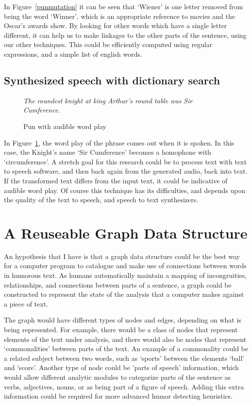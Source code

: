 In Figure~\ref{punmutation} it can be seen that `Wiener'  is one letter removed from being the word `Winner', which is an appropriate reference to movies and the Oscar's awards show. By looking for other words which have a single letter different, it can help us to make linkages to the other parts of the sentence, using our other techniques. This could be efficiently computed using regular expressions, and a simple list of english words.

\subsection{Synthesized speech with dictionary search}
\begin{figure}[h]
\begin{mdframed}
  \emph{The roundest knight at king Arthur's round table was Sir Cumference.}
  \caption{Pun with audible word play}
 \label{sircumference}
\end{mdframed}
\end{figure}

In Figure~\ref{sircumference}, the word play of the phrase comes out when it is spoken. In this case, the Knight's name `Sir Cumference' becomes a homophone with `circumference'.
A stretch goal for this research could be to process text with text to speech software, and then back again from the generated audio, back into text. If the transformed text
differs from the input text, it could be indicative of audible word play. Of course this technique has its difficulties, and depends upon the quality of the text to speech, and speech to text synthesizers.

\section{A Reuseable Graph Data Structure}

An hypothesis that I have is that a graph data structure could be the best way for a computer program to catalogue and make use of connections between words in humorous text. As humans automatically maintain a mapping of incongruities, relationships, and connections between parts of a sentence, a graph could be constructed to represent the state of the analysis that a computer makes against a piece of text. 

The graph would have different types of nodes and edges, depending on what is being represented. For example, there would be a class of nodes that represent elements of the text under analysis, and there would also be nodes that represent `commonalities' between parts of the text. An example of a commonality could be a related subject between two words, such as `sports' between the elements `ball' and `score'. Another type of node could be 'parts of speech' information, which would allow different analytic modules to categorize parts of the sentence as verbs, adjectives, nouns, or as being part of a figure of speech. Adding this extra information could be required for more advanced humor detecting heuristics.

